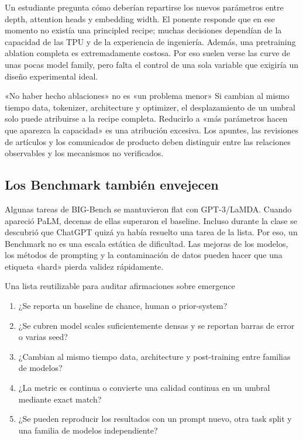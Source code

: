 Un estudiante pregunta cómo deberían repartirse los nuevos parámetros entre depth, attention heads y embedding width. El ponente responde que en ese momento no existía una principled recipe; muchas decisiones dependían de la capacidad de las TPU y de la experiencia de ingeniería. Además, una pretraining ablation completa es extremadamente costosa. Por eso suelen verse las curve de unas pocas model family, pero falta el control de una sola variable que exigiría un diseño experimental ideal.

\begin{warningbox}{«No haber hecho ablaciones» no es «un problema menor»}
Si cambian al mismo tiempo data, tokenizer, architecture y optimizer, el desplazamiento de un umbral solo puede atribuirse a la recipe completa. Reducirlo a «más parámetros hacen que aparezca la capacidad» es una atribución excesiva. Los apuntes, las revisiones de artículos y los comunicados de producto deben distinguir entre las relaciones observables y los mecanismos no verificados.
\end{warningbox}

\subsection{Los Benchmark también envejecen}

Algunas tareas de BIG-Bench se mantuvieron flat con GPT-3/LaMDA. Cuando apareció PaLM, decenas de ellas superaron el baseline. Incluso durante la clase se descubrió que ChatGPT quizá ya había resuelto una tarea de la lista. Por eso, un Benchmark no es una escala estática de dificultad. Las mejoras de los modelos, los métodos de prompting y la contaminación de datos pueden hacer que una etiqueta «hard» pierda validez rápidamente.

\begin{importantbox}{Una lista reutilizable para auditar afirmaciones sobre emergence}
\begin{enumerate}
  \item ¿Se reporta un baseline de chance, human o prior-system?
  \item ¿Se cubren model scales suficientemente densas y se reportan barras de error o varias seed?
  \item ¿Cambian al mismo tiempo data, architecture y post-training entre familias de modelos?
  \item ¿La metric es continua o convierte una calidad continua en un umbral mediante exact match?
  \item ¿Se pueden reproducir los resultados con un prompt nuevo, otra task split y una familia de modelos independiente?
\end{enumerate}
\end{importantbox}

